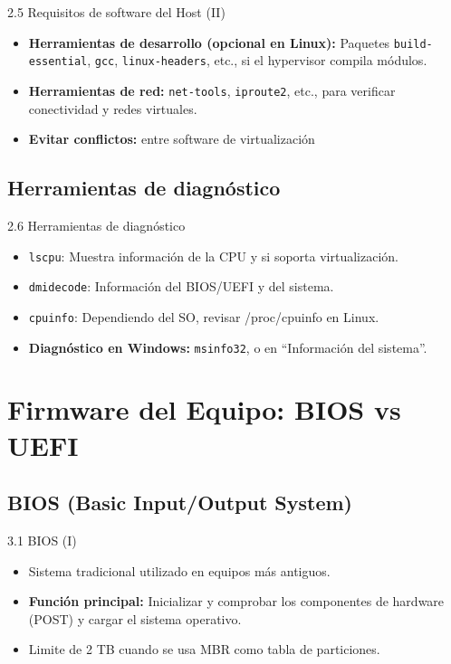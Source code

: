 \documentclass{beamer}
\begin{document}
\begin{frame}{2.5 Requisitos de software del Host (II)}
	\begin{itemize}
		\item \textbf{Herramientas de desarrollo (opcional en Linux):} Paquetes \texttt{build-essential}, \texttt{gcc}, \texttt{linux-headers}, etc., si el hypervisor compila módulos.
		\item \textbf{Herramientas de red:} \texttt{net-tools}, \texttt{iproute2}, etc., para verificar conectividad y redes virtuales.
		\item \textbf{Evitar conflictos:} entre software de virtualización
	\end{itemize}
\end{frame}

\subsection{Herramientas de diagnóstico}
\begin{frame}{2.6 Herramientas de diagnóstico}
	\begin{itemize}
		\item \texttt{lscpu}: Muestra información de la CPU y si soporta virtualización.
		\item \texttt{dmidecode}: Información del BIOS/UEFI y del sistema.
		\item \texttt{cpuinfo}: Dependiendo del SO, revisar /proc/cpuinfo en Linux.
		\item \textbf{Diagnóstico en Windows:} \texttt{msinfo32}, o en “Información del sistema”.
	\end{itemize}
\end{frame}

\section{Firmware del Equipo: BIOS vs UEFI}

\subsection{BIOS (Basic Input/Output System)}
\begin{frame}{3.1 BIOS (I)}
	\begin{itemize}
		\item Sistema tradicional utilizado en equipos más antiguos.
		\item \textbf{Función principal:} Inicializar y comprobar los componentes de hardware (POST) y cargar el sistema operativo.
		\item Limite de 2 TB cuando se usa MBR como tabla de particiones.
	\end{itemize}
\end{frame}
\end{document}
